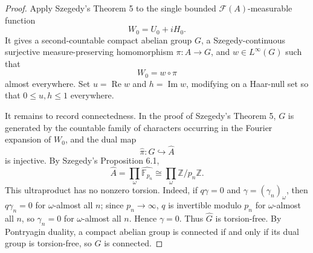 \documentclass[11pt]{article}
\numberwithin{equation}{section}
\newcommand{\F}{\mathbb F}
\newcommand{\Z}{\mathbb Z}
\newcommand{\1}{\mathbf 1}
\newcommand{\calF}{\mathcal F}
\begin{document}
\begin{proof}
Apply Szegedy's Theorem 5 to the single bounded
\(\calF(A)\)-measurable function
\[
        W_0=U_0+iH_0.
\]
It gives a second-countable compact abelian group \(G\), a
Szegedy-continuous surjective measure-preserving homomorphism
\(\pi:A\to G\), and \(w\in L^\infty(G)\) such that
\[
        W_0=w\circ\pi
\]
almost everywhere.  Set \(u=\operatorname{Re}w\) and
\(h=\operatorname{Im}w\), modifying on a Haar-null set so that
\(0\le u,h\le1\) everywhere.

It remains to record connectedness.  In the proof of Szegedy's Theorem 5,
\(G\) is generated by the countable family of characters occurring in the
Fourier expansion of \(W_0\), and the dual map
\[
        \widehat\pi:\widehat G\hookrightarrow\widehat A
\]
is injective.  By Szegedy's Proposition 6.1,
\[
        \widehat A=\prod_\omega\widehat{\F_{p_n}}
        \cong\prod_\omega\Z/p_n\Z.
\]
This ultraproduct has no nonzero torsion.  Indeed, if \(q\gamma=0\) and
\(\gamma=(\gamma_n)_\omega\), then \(q\gamma_n=0\) for \(\omega\)-almost
all \(n\); since \(p_n\to\infty\), \(q\) is invertible modulo \(p_n\) for
\(\omega\)-almost all \(n\), so \(\gamma_n=0\) for \(\omega\)-almost all
\(n\).  Hence \(\gamma=0\).  Thus \(\widehat G\) is torsion-free.  By
Pontryagin duality, a compact abelian group is connected if and only if
its dual group is torsion-free, so \(G\) is connected.
\end{proof}
\end{document}
